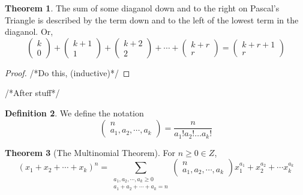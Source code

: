 \documentclass[11pt]{article}
\theoremstyle{definition}
\newtheorem{theorem}{Theorem}[section]
\newtheorem{definition}[theorem]{Definition}
\begin{document}
\begin{theorem}
    The sum of some diaganol down and to the right on Pascal's Triangle is described by the term down and to the left of the lowest term in the diaganol. Or, 
    \begin{equation*}
        \begin{pmatrix} k    \\ 0 \end{pmatrix} +
        \begin{pmatrix} k+1  \\ 1 \end{pmatrix} +
        \begin{pmatrix} k+2  \\ 2 \end{pmatrix} +
        \cdots +
        \begin{pmatrix} k+r  \\ r \end{pmatrix} =
        \begin{pmatrix} k+r+1\\ r\end{pmatrix}
    \end{equation*}
\end{theorem}
\begin{proof}
    /*Do this, (inductive)*/
\end{proof}
/*After stuff*/
\begin{definition}
    We define the notation $$\begin{pmatrix} n \\ a_1,a_2,\cdots,a_k \end{pmatrix}=\frac{n}{a_1! a_2! \ldots a_k!}$$
\end{definition}
\begin{theorem} [The Multinomial Theorem] For $n \geq 0 \in Z$,
    \begin{equation*}
        {(x_1+x_2+\cdots+x_k)}^{n}=\sum_{\substack{a_1,a_2,\cdots,a_k \geq 0 \\ a_1+a_2+\cdots+a_k=n}}
        \begin{pmatrix} n \\ a_1,a_2,\cdots,a_k \end{pmatrix}
        x_1^{a_1} + x_2^{a_2} + \cdots x_k^{a_k}
    \end{equation*}
\end{theorem}
\end{document}
